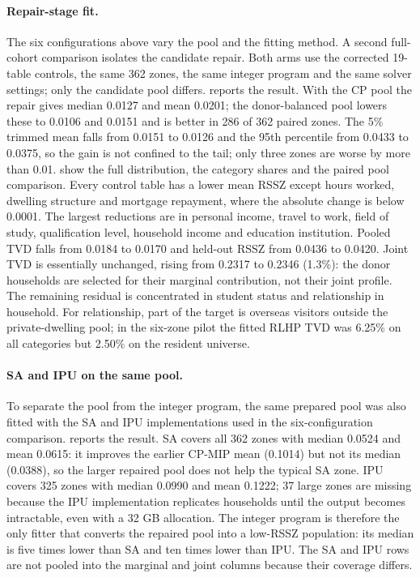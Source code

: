 \paragraph{Repair-stage fit.}
The six configurations above vary the pool and the fitting method.  A second
full-cohort comparison isolates the candidate repair.  Both arms use the
corrected 19-table controls, the same 362 zones, the same integer program and
the same solver settings; only the candidate pool differs.
 reports the result.  With the CP pool the repair gives
median 0.0127 and mean 0.0201; the donor-balanced pool lowers these to 0.0106
and 0.0151 and is better in 286 of 362 paired zones.  The 5\% trimmed mean
falls from 0.0151 to 0.0126 and the 95th percentile from 0.0433 to 0.0375, so
the gain is not confined to the tail; only three zones are worse by more than
0.01.   show the
full distribution, the category shares and the paired pool comparison.  Every
control table has a lower mean RSSZ except
hours worked, dwelling structure and mortgage repayment, where the absolute
change is below 0.0001.
The largest reductions are in personal income, travel to work, field of study,
qualification level, household income and education institution.
Pooled TVD falls from 0.0184 to 0.0170 and held-out RSSZ from 0.0436 to 0.0420.
Joint TVD is essentially unchanged, rising from 0.2317 to 0.2346 (1.3\%): the
donor households are selected for their marginal contribution, not their joint
profile.  The remaining residual is concentrated in student status and
relationship in household.  For relationship, part of the target is overseas
visitors outside the private-dwelling pool; in the six-zone pilot the fitted
RLHP TVD was 6.25\% on all categories but 2.50\% on the resident universe.

\paragraph{SA and IPU on the same pool.}
To separate the pool from the integer program, the same prepared pool was also
fitted with the SA and IPU implementations used in the six-configuration
comparison.   reports the result.  SA covers all 362 zones
with median 0.0524 and mean 0.0615: it improves the earlier CP-MIP mean
(0.1014) but not its median (0.0388), so the larger repaired pool does not help
the typical SA zone.  IPU covers 325 zones with median 0.0990 and mean 0.1222;
37 large zones are missing because the IPU implementation replicates households
until the output becomes intractable, even with a 32 GB allocation.  The integer
program is therefore the only fitter that converts the repaired pool into a
low-RSSZ population: its median is five times lower than SA and ten times lower
than IPU.  The SA and IPU rows are not pooled into the marginal and joint
columns because their coverage differs.

